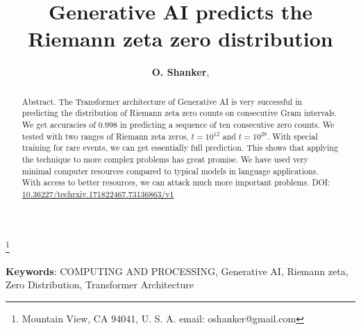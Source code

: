 \documentclass[twoside]{article}
\begin{document}


\newtheorem{theorem}{Theorem}[section]
\newtheorem{lemma}[theorem]{Lemma}

\theoremstyle{definition}
\newtheorem{definition}[theorem]{Definition}
\newtheorem{example}[theorem]{Example}
\newtheorem{xca}[theorem]{Exercise}

\theoremstyle{remark}
\newtheorem{remark}[theorem]{Remark}



\date{}
\lhead[]{}
\rhead[]{}

\title{\bf{Generative AI predicts the Riemann zeta zero distribution}}

\maketitle


\author{{\textbf{O. Shanker}},}
\thanks{ Mountain View, CA 94041, U. S. A. email: oshanker@gmail.com}

\thispagestyle{fancy}

\begin{abstract}
Abstract. 
The Transformer architecture of Generative AI is very successful in predicting the distribution of Riemann zeta zero counts on consecutive Gram intervals. We get accuracies of $0.998$
in predicting a sequence of ten consecutive zero counts. We tested with two ranges of Riemann zeta zeros, $t=10^{12}$ and $t=10^{28}$. With special training for rare events, we can get essentially full prediction. This shows that applying the technique to more complex problems has great promise. We have used very minimal computer resources compared to typical models in language applications. With access to better resources, we can attack much more important problems.
DOI: \href{http://dx.doi.org/10.36227/techrxiv.171822467.73136863/v1}{10.36227/techrxiv.171822467.73136863/v1}

\end{abstract}
{\textbf {Keywords}:} COMPUTING AND PROCESSING, Generative AI, Riemann zeta, Zero Distribution,  Transformer Architecture 


\end{document}
